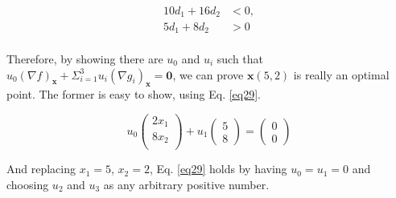 \begin{equation}
\begin{aligned}
10d_1 + 16d_2 &< 0,\\
5d_1 + 8d_2 &> 0\\
\end{aligned}
\label{eq28}
\end{equation}

Therefore, by showing there are $u_0$ and $u_i$ such that $u_0(\nabla f)_\mathbf{x} + \Sigma_{i=1}^{3} u_i (\nabla g_i)_\mathbf{x} = \mathbf{0}$, we can prove $\mathbf{x}(5,2)$ is really an optimal point.
The former is easy to show, using Eq. \ref{eq29}.

\begin{equation}
u_0 \begin{pmatrix} 2x_1\\ 8x_2\\ \end{pmatrix} + u_1 \begin{pmatrix} 5\\ 8\end{pmatrix} = \begin{pmatrix}
0 \\ 0 \end{pmatrix}
\label{eq29}
\end{equation}

And replacing $x_1 = 5$, $x_2 = 2$, Eq. \ref{eq29} holds by having $u_0 = u_1 = 0$ and choosing $u_2$ and $u_3$ as any arbitrary positive number.
